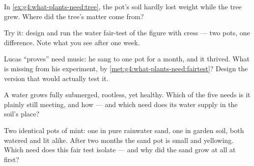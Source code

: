 \begin{exercise}[$\star$]\label{exo:g4:what-plants-need:7}
In \cref{ex:g4:what-plants-need:tree}, the pot's soil hardly
lost weight while the tree grew. Where did the tree's matter
come from?
\end{exercise}

\begin{exercise}[$\star$]\label{exo:g4:what-plants-need:8}
Try it: design and run the water fair-test of the figure with
cress --- two pots, one difference. Note what you see after one
week.
\end{exercise}

\begin{exercise}[$\star\star$]\label{exo:g4:what-plants-need:9}
Lucas ``proves''  need music: he sang to one pot for a
month, and it thrived. What is missing from his experiment, by
\cref{met:g4:what-plants-need:fairtest}? Design the version
that would actually test it.
\end{exercise}

\begin{exercise}[$\star\star$]\label{exo:g4:what-plants-need:10}
A water  grows fully submerged, rootless, yet healthy.
Which of the five needs is it plainly still meeting, and how
--- and which need does its water supply in the soil's place?
\end{exercise}

\begin{exercise}[$\star\star\star$]\label{exo:g4:what-plants-need:11}
Two identical pots of mint: one in pure rainwater sand, one in
garden soil, both watered and lit alike. After two months the
sand pot is small and yellowing. Which need does this fair test
isolate --- and why did the sand  grow at all at first?
\end{exercise}
